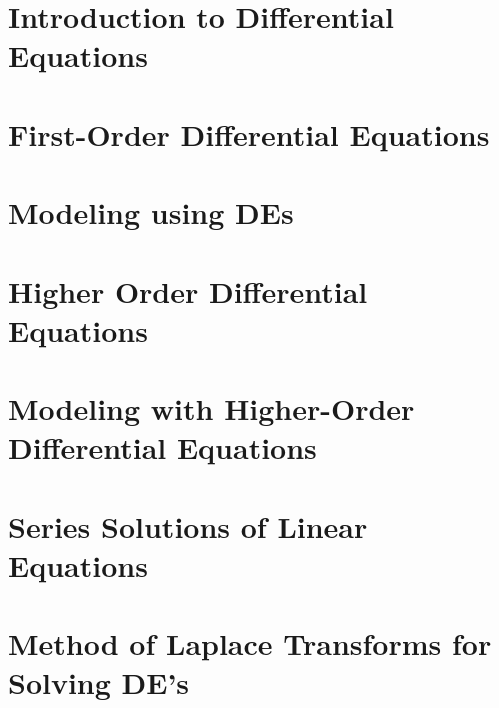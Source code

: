 \documentclass[title={MATH 252 - Introduction to Differential Equations Notes}]{math252notes}
\begin{document}
\maketitle
\tableofcontents

\chapter[Introduction to Diff-Eq]{Introduction to Differential Equations}\label{ch:introduction-to-differential-equations}

\chapter{First-Order Differential Equations}\label{ch:first-order-differential-equations}

\chapter{Modeling using DE{s}}\label{ch:modeling-using-des}

\chapter[Higher Order DE{s}]{Higher Order Differential Equations}\label{ch:higher-order-differential-equations}

\chapter[Modeling with Higher-Order DEs]{Modeling with Higher-Order Differential Equations}\label{ch:modeling-with-higher-order-differential-equations}

\chapter{Series Solutions of Linear Equations}\label{ch:series-solutions-of-linear-equations}

\chapter[The Laplace Transform]{Method of Laplace Transforms for Solving DE's}\label{ch:method-of-laplace-transforms-for-solving-de's}
\end{document}
